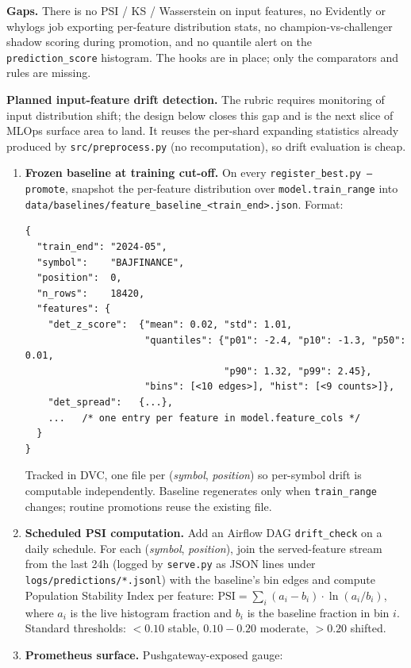\documentclass[11pt,a4paper]{article}
\begin{document}
\textbf{Gaps.} There is no PSI / KS / Wasserstein on input features, no Evidently or whylogs job exporting per-feature distribution stats, no champion-vs-challenger shadow scoring during promotion, and no quantile alert on the \texttt{prediction\_score} histogram. The hooks are in place; only the comparators and rules are missing.

\textbf{Planned input-feature drift detection.} The rubric requires monitoring of input distribution shift; the design below closes this gap and is the next slice of MLOps surface area to land. It reuses the per-shard expanding statistics already produced by \texttt{src/preprocess.py} (no recomputation), so drift evaluation is cheap.

\begin{enumerate}[leftmargin=1.5em,itemsep=0pt]
  \item \textbf{Frozen baseline at training cut-off.} On every \texttt{register\_best.py --promote}, snapshot the per-feature distribution over \texttt{model.train\_range} into \texttt{data/baselines/feature\_baseline\_<train\_end>.json}. Format:
\begin{lstlisting}[style=bashstyle]
{
  "train_end": "2024-05",
  "symbol":    "BAJFINANCE",
  "position":  0,
  "n_rows":    18420,
  "features": {
    "det_z_score":  {"mean": 0.02, "std": 1.01,
                     "quantiles": {"p01": -2.4, "p10": -1.3, "p50": 0.01,
                                   "p90": 1.32, "p99": 2.45},
                     "bins": [<10 edges>], "hist": [<9 counts>]},
    "det_spread":   {...},
    ...   /* one entry per feature in model.feature_cols */
  }
}
\end{lstlisting}
  Tracked in DVC, one file per (\emph{symbol}, \emph{position}) so per-symbol drift is computable independently. Baseline regenerates only when \texttt{train\_range} changes; routine promotions reuse the existing file.
  \item \textbf{Scheduled PSI computation.} Add an Airflow DAG \texttt{drift\_check} on a daily schedule. For each (\emph{symbol}, \emph{position}), join the served-feature stream from the last 24h (logged by \texttt{serve.py} as JSON lines under \texttt{logs/predictions/*.jsonl}) with the baseline's bin edges and compute Population Stability Index per feature: $\text{PSI} = \sum_i (a_i - b_i) \cdot \ln(a_i / b_i)$, where $a_i$ is the live histogram fraction and $b_i$ is the baseline fraction in bin $i$. Standard thresholds: $<\!0.10$ stable, $0.10\!-\!0.20$ moderate, $>\!0.20$ shifted.
  \item \textbf{Prometheus surface.} Pushgateway-exposed gauge:

\end{enumerate}
\end{document}
